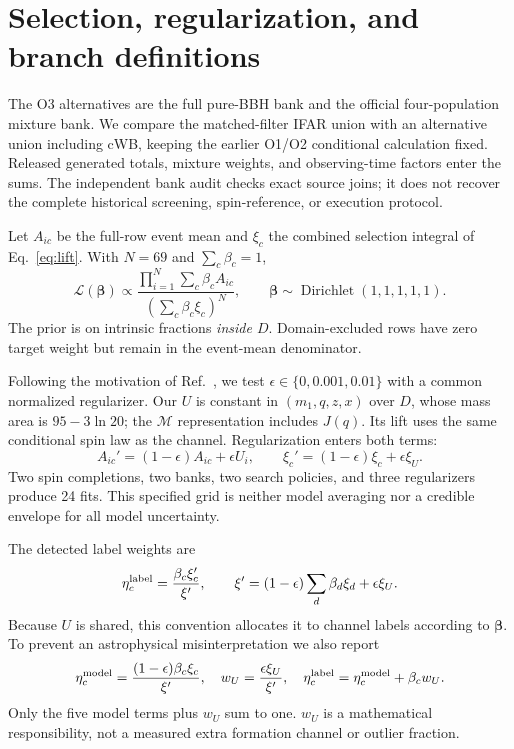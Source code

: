 \section{Selection, regularization, and branch definitions}
The O3 alternatives are the full pure-BBH bank and the official four-population mixture bank. We compare the matched-filter IFAR union with an alternative union including cWB, keeping the earlier O1/O2 conditional calculation fixed. Released generated totals, mixture weights, and observing-time factors enter the sums. The independent bank audit checks exact source joins; it does not recover the complete historical screening, spin-reference, or execution protocol.

Let $A_{ic}$ be the full-row event mean and $\xi_c$ the combined selection integral of Eq.~\eqref{eq:lift}. With $N=69$ and $\sum_c\beta_c=1$,
\begin{equation}\label{eq:likelihood}
\mathcal L(\bm\beta)\propto
\frac{\prod_{i=1}^N\sum_c\beta_c A_{ic}}
{\left(\sum_c\beta_c\xi_c\right)^N},\qquad
\bm\beta\sim\operatorname{Dirichlet}(1,1,1,1,1).
\end{equation}
The prior is on intrinsic fractions \emph{inside $D$}. Domain-excluded rows have zero target weight but remain in the event-mean denominator.

Following the motivation of Ref.~\cite{colloms}, we test $\epsilon\in\{0,0.001,0.01\}$ with a common normalized regularizer. Our $U$ is constant in $(m_1,q,z,x)$ over $D$, whose mass area is $95-3\ln20$; the $\mathcal M$ representation includes $J(q)$. Its lift uses the same conditional spin law as the channel. Regularization enters both terms:
\begin{equation}\label{eq:regularization}
A_{ic}'=(1-\epsilon)A_{ic}+\epsilon U_i,
\qquad \xi_c'=(1-\epsilon)\xi_c+\epsilon\xi_U.
\end{equation}
Two spin completions, two banks, two search policies, and three regularizers produce 24 fits. This specified grid is neither model averaging nor a credible envelope for all model uncertainty.

The detected label weights are
\begin{equation}\label{eq:label}
\eta_c^{\rm label}=\frac{\beta_c\xi_c'}{\xi'},\qquad
\xi'=(1-\epsilon)\sum_d\beta_d\xi_d+\epsilon\xi_U.
\end{equation}
Because $U$ is shared, this convention allocates it to channel labels according to $\bm\beta$. To prevent an astrophysical misinterpretation we also report
\begin{equation}\label{eq:decomposition}
\eta_c^{\rm model}=\frac{(1-\epsilon)\beta_c\xi_c}{\xi'},\quad
w_U=\frac{\epsilon\xi_U}{\xi'},\quad
\eta_c^{\rm label}=\eta_c^{\rm model}+\beta_c w_U.
\end{equation}
Only the five model terms plus $w_U$ sum to one. $w_U$ is a mathematical responsibility, not a measured extra formation channel or outlier fraction.

